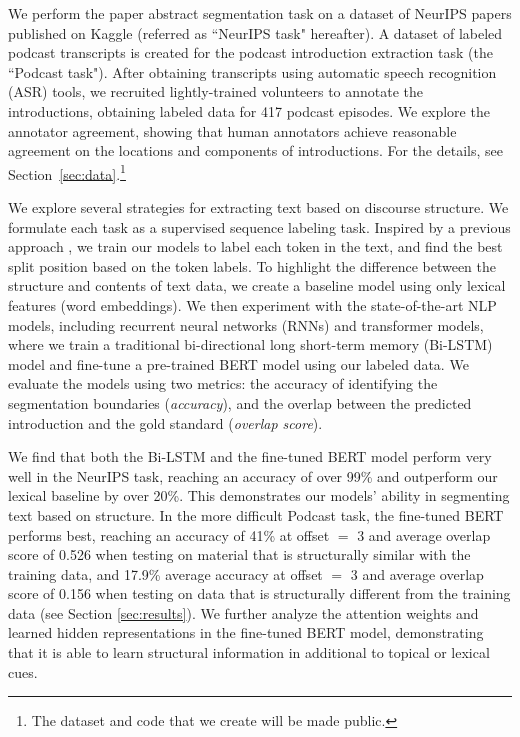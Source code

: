  
We perform the paper abstract segmentation task on a dataset of NeurIPS papers published on Kaggle \cite{nipsdata} (referred as ``NeurIPS task" hereafter). A dataset of labeled podcast transcripts is created for the podcast introduction extraction task (the ``Podcast task").  After obtaining transcripts using automatic speech recognition (ASR) tools, we recruited lightly-trained volunteers to annotate the introductions, obtaining labeled data for 417 podcast episodes. We explore the annotator agreement, showing that human annotators achieve reasonable agreement on the locations and components of introductions. For the details, see Section~\ref{sec:data}.\footnote{The dataset and code that we create will be made public.}

We explore several strategies for extracting text based on discourse structure. We formulate each task as a supervised sequence labeling task. Inspired by a previous approach \cite{salloum2017automated}, we train our models to label each token in the text, and find the best split position based on the token labels. To highlight the difference between the structure and contents of text data, we create a baseline model using only lexical features (word embeddings). We then experiment with the state-of-the-art NLP models, including recurrent neural networks (RNNs) and transformer models, where we train a traditional bi-directional long short-term memory (Bi-LSTM) model and fine-tune a pre-trained BERT model \cite{devlin2018bert} using our labeled data. We evaluate the models using two metrics: the accuracy of identifying the segmentation boundaries (\emph{accuracy}), and the overlap between the predicted introduction and the gold standard (\emph{overlap score}). 

We find that both the Bi-LSTM and the fine-tuned BERT model perform very well in the NeurIPS task, reaching an accuracy of over 99\% and outperform our lexical baseline by over 20\%. This demonstrates our models' ability in segmenting text based on structure. In the more difficult Podcast task, the fine-tuned BERT performs best, reaching an accuracy of 41\% at offset $=$ 3 and average overlap score of 0.526 when testing on material that is structurally similar with the training data, and 17.9\% average accuracy at offset $=$ 3 and average overlap score of 0.156 when testing on data that is structurally different from the training data (see Section \ref{sec:results}). We further analyze the attention weights and learned hidden representations in the fine-tuned BERT model, demonstrating that it is able to learn structural information in additional to topical or lexical cues.

